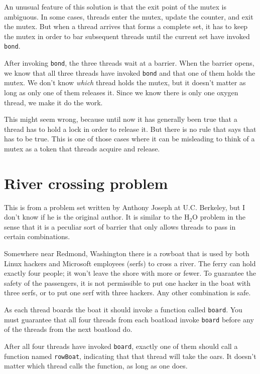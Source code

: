\documentclass{book}
\begin{document}
An unusual feature of this solution is that
the exit point of the mutex is ambiguous.  In
some cases, threads enter the mutex, update the counter, and exit the
mutex.  But when a thread arrives that forms a complete set, it has to
keep the mutex in order to bar subsequent threads until the current
set have invoked {\tt bond}.

After invoking {\tt bond}, the three threads wait at a barrier.
When the barrier opens, we know that all three threads have invoked
{\tt bond} and that one of them holds the mutex.  We don't know
{\em which} thread holds the mutex, but it doesn't matter as long
as only one of them releases it.  Since we know there is only one
oxygen thread, we make it do the work.

This might seem wrong, because until now it
has generally been true that a thread has to hold a lock in
order to release it.  But there is no rule that says that has
to be true.  This is one of those cases where it can be misleading
to think of a mutex as a token that threads acquire and release.


\section {River crossing problem}

This is from a problem set written by Anthony Joseph
at U.C. Berkeley, but I don't know if he is the original author.
It is similar to the H$_2$O problem in the sense that it is
a peculiar sort of barrier that only allows threads to pass
in certain combinations.

Somewhere near Redmond, Washington there is a rowboat that is used by
both Linux hackers and Microsoft employees (serfs) to cross a river.  The
ferry can hold exactly four people; it won't leave the shore with more
or fewer.  To guarantee the safety of the passengers, it is not
permissible to put one hacker in the boat with three serfs, or to
put one serf with three hackers.  Any other combination is safe.

As each thread boards the boat it should invoke a function
called {\tt board}.  You must guarantee that all four threads
from each boatload invoke {\tt board} before any of the threads
from the next boatload do.

After all four threads have invoked {\tt board}, exactly one of
them should call a function named {\tt rowBoat}, indicating
that that thread will take the oars.  It doesn't matter which thread
calls the function, as long as one does.
\end{document}

